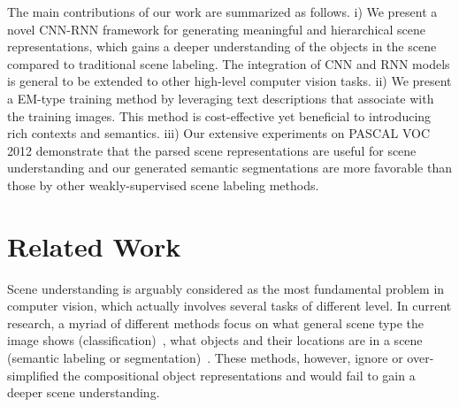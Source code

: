 \documentclass[10pt,twocolumn,letterpaper]{article}
\begin{document}
The main contributions of our work are summarized as follows. i) We present a novel CNN-RNN framework for generating meaningful and hierarchical scene representations, which gains a deeper understanding of the objects in the scene compared to traditional scene labeling. The integration of CNN and RNN models is general to be extended to other high-level computer vision tasks. ii) We present a EM-type training method by leveraging text descriptions that associate with the training images. This method is cost-effective yet beneficial to introducing rich contexts and semantics. iii) Our extensive experiments on PASCAL VOC 2012 demonstrate that the parsed scene representations are useful for scene understanding and our generated semantic segmentations are more favorable than those by other weakly-supervised scene labeling methods.



\section{Related Work}

Scene understanding is arguably considered as the most fundamental problem in computer vision, which actually involves several tasks of different level. In current research, a myriad of different methods focus on what general scene type the image shows (classification)~\cite{DBLP:VisualAttr}\cite{DBLP:Multi-Class}\cite{DBLP:fine-grained}, what objects and their locations are in a scene (semantic labeling or segmentation)~\cite{DBLP:Seg-03}\cite{DBLP:Seg-09}\cite{DBLP:Seg-15}\cite{tighe2014scene}. These methods, however, ignore or over-simplified the compositional object representations and would fail to gain a deeper scene understanding.

\end{document}
